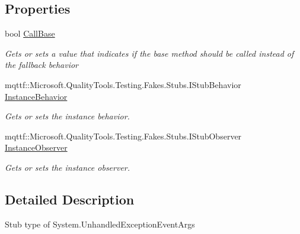 \subsection*{Properties}
\begin{DoxyCompactItemize}
\item 
bool \hyperlink{class_system_1_1_fakes_1_1_stub_unhandled_exception_event_args_a9a12734c9aab503b8cd4b00f1bd1000f}{Call\-Base}
\begin{DoxyCompactList}\small\item\em Gets or sets a value that indicates if the base method should be called instead of the fallback behavior\end{DoxyCompactList}\item 
mqttf\-::\-Microsoft.\-Quality\-Tools.\-Testing.\-Fakes.\-Stubs.\-I\-Stub\-Behavior \hyperlink{class_system_1_1_fakes_1_1_stub_unhandled_exception_event_args_a953c9c77e896745ae0e5685453afdca4}{Instance\-Behavior}
\begin{DoxyCompactList}\small\item\em Gets or sets the instance behavior.\end{DoxyCompactList}\item 
mqttf\-::\-Microsoft.\-Quality\-Tools.\-Testing.\-Fakes.\-Stubs.\-I\-Stub\-Observer \hyperlink{class_system_1_1_fakes_1_1_stub_unhandled_exception_event_args_aaa08d5a76a9caa4cab8b91f1bf55cc1d}{Instance\-Observer}
\begin{DoxyCompactList}\small\item\em Gets or sets the instance observer.\end{DoxyCompactList}\end{DoxyCompactItemize}


\subsection{Detailed Description}
Stub type of System.\-Unhandled\-Exception\-Event\-Args



